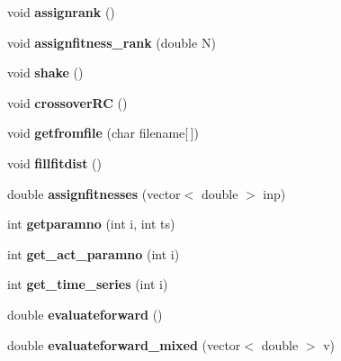 \begin{DoxyCompactItemize}
\mbox{\label{class_c_g_a_adc724b89d9d2c56aa3ddfdf04f38dc90}} 
void {\bfseries assignrank} ()
\item 
\mbox{\label{class_c_g_a_a42904cd055ce7ec3a69930384f2ccaf3}} 
void {\bfseries assignfitness\+\_\+rank} (double N)
\item 
\mbox{\label{class_c_g_a_a29284654cc9b482df425634e74ad497e}} 
void {\bfseries shake} ()
\item 
\mbox{\label{class_c_g_a_a522ada0549687608b2ae42903bd6d24d}} 
void {\bfseries crossover\+RC} ()
\item 
\mbox{\label{class_c_g_a_aab383088715cc87af51fb05a51ce3906}} 
void {\bfseries getfromfile} (char filename\mbox{[}$\,$\mbox{]})
\item 
\mbox{\label{class_c_g_a_af3407369450057a0a6ed82a5e6a83dff}} 
void {\bfseries fillfitdist} ()
\item 
\mbox{\label{class_c_g_a_acc5bb3a015f9935a715d18a12add39a8}} 
double {\bfseries assignfitnesses} (vector$<$ double $>$ inp)
\item 
\mbox{\label{class_c_g_a_adbea89ec205558e00eb10ecd6f841119}} 
int {\bfseries getparamno} (int i, int ts)
\item 
\mbox{\label{class_c_g_a_ae75a2bfdab70e60ef8fc98bdae13025a}} 
int {\bfseries get\+\_\+act\+\_\+paramno} (int i)
\item 
\mbox{\label{class_c_g_a_aeb78a824a485a6502cffd8d10b710ef0}} 
int {\bfseries get\+\_\+time\+\_\+series} (int i)
\item 
\mbox{\label{class_c_g_a_a2ac58ed2626f4d3190bdef58ef0eed65}} 
double {\bfseries evaluateforward} ()
\item 
\mbox{\label{class_c_g_a_ab736a4b243f47c3c98010e05a71a21e9}} 
double {\bfseries evaluateforward\+\_\+mixed} (vector$<$ double $>$ v)
\item 
\mbox{\label{class_c_g_a_a5b8c0d0ac201be7334fefe8d8b7e8df0}} 

\end{DoxyCompactItemize}
